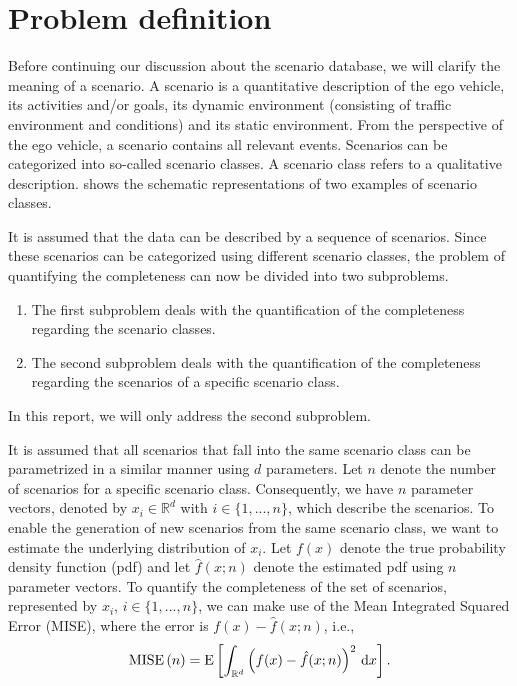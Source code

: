 \documentclass[10pt,final,a4paper,oneside,onecolumn]{article}
\newcommand*{\ud}{\mathrm{\,d}}                                 %
\newcommand{\expectation}[1]{\textup{E} \left[ #1 \right]}
\newcommand{\mise}[1]{\textup{MISE} \left( #1 \right)}
\theoremstyle{plain}\newtheorem{definition}{Definition}[section]    %
\theoremstyle{definition}\newtheorem{example}{Example}[section]     %
\theoremstyle{remark}\newtheorem{remarkenv}{Remark}[section]        %
\begin{document}
\section{Problem definition}
\label{sec:problem}

Before continuing our discussion about the scenario database, we will clarify the meaning of a scenario. A scenario is a quantitative description of the ego vehicle, its activities and/or goals, its dynamic environment (consisting of traffic environment and conditions) and its static environment. From the perspective of the ego vehicle, a scenario contains all relevant events. Scenarios can be categorized into so-called scenario classes. A scenario class refers to a qualitative description.  shows the schematic representations of two examples of scenario classes.

It is assumed that the data can be described by a sequence of scenarios. Since these scenarios can be categorized using different scenario classes, the problem of quantifying the completeness can now be divided into two subproblems.
\begin{enumerate}
	\item The first subproblem deals with the quantification of the completeness regarding the scenario classes.
	\item The second subproblem deals with the quantification of the completeness regarding the scenarios of a specific scenario class.
\end{enumerate}
In this report, we will only address the second subproblem. 

It is assumed that all scenarios that fall into the same scenario class can be parametrized in a similar manner using $d$ parameters. Let $n$ denote the number of scenarios for a specific scenario class. Consequently, we have $n$ parameter vectors, denoted by $x_i \in \mathbb{R}^d$ with $i\in\{1,...,n\}$, which describe the scenarios. To enable the generation of new scenarios from the same scenario class, we want to estimate the underlying distribution of $x_i$. Let $f(x)$ denote the true probability density function (pdf) and let $\hat{f}(x;n)$ denote the estimated pdf using $n$ parameter vectors. To quantify the completeness of the set of scenarios, represented by $x_i$, $i\in\{1,...,n\}$, we can make use of the Mean Integrated Squared Error (MISE), where the error is $f(x)-\hat{f}(x;n)$, i.e.,
\begin{equation} \label{eq:mise}
	\mise{n} = \expectation{ \int_{\mathbb{R}^d} \left(f(x) - \hat{f}(x;n)\right)^2 \ud x}.
\end{equation}
\end{document}
